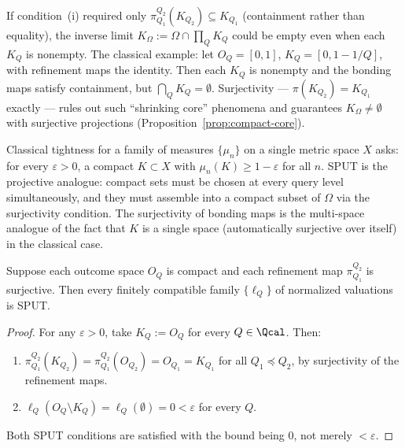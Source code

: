 \begin{remark}
If condition~(i) required only $\pi^{Q_2}_{Q_1}(K_{Q_2}) \subseteq
K_{Q_1}$ (containment rather than equality), the inverse limit
$K_\Omega := \Omega \cap \prod_Q K_Q$ could be empty even when each
$K_Q$ is nonempty.  The classical example: let $O_Q = [0,1]$,
$K_Q = [0, 1-1/Q]$, with refinement maps the identity.  Then each
$K_Q$ is nonempty and the bonding maps satisfy containment, but
$\bigcap_Q K_Q = \emptyset$.  Surjectivity --- $\pi(K_{Q_2})
= K_{Q_1}$ exactly --- rules out such ``shrinking core'' phenomena and
guarantees $K_\Omega \neq \emptyset$ with surjective projections
(Proposition~\ref{prop:compact-core}).
\end{remark}

\begin{remark}
Classical tightness for a family of measures $\{\mu_n\}$ on a single
metric space $X$ asks: for every $\varepsilon > 0$, a compact
$K \subset X$ with $\mu_n(K) \geq 1-\varepsilon$ for all $n$.  SPUT
is the projective analogue: compact sets must be chosen at every
query level simultaneously, and they must assemble into a compact
subset of $\Omega$ via the surjectivity condition.  The surjectivity
of bonding maps is the multi-space analogue of the fact that $K$ is
a single space (automatically surjective over itself) in the
classical case.
\end{remark}

\begin{proposition}
\label{prop:compact-implies-sput}
Suppose each outcome space $O_Q$ is compact and each refinement map
$\pi^{Q_2}_{Q_1}$ is surjective.  Then every finitely compatible
family $\{\ell_Q\}$ of normalized valuations is SPUT.
\end{proposition}

\begin{proof}
For any $\varepsilon > 0$, take $K_Q := O_Q$ for every $Q \in \Qcal$.
Then:
\begin{enumerate}[label=(\roman*)]
\item $\pi^{Q_2}_{Q_1}(K_{Q_2}) = \pi^{Q_2}_{Q_1}(O_{Q_2}) = O_{Q_1}
  = K_{Q_1}$ for all $Q_1 \preceq Q_2$, by surjectivity of the
  refinement maps.
\item $\ell_Q(O_Q \setminus K_Q) = \ell_Q(\emptyset) = 0 < \varepsilon$
  for every $Q$.
\end{enumerate}
Both SPUT conditions are satisfied with the bound being $0$, not
merely $< \varepsilon$.
\end{proof}

